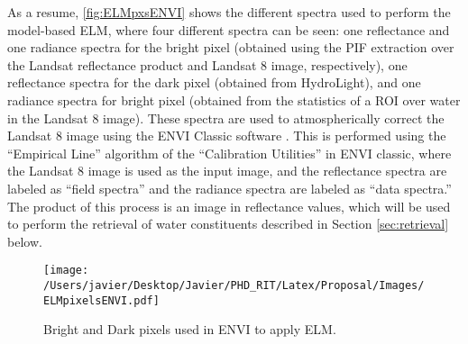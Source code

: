As a resume, \autoref{fig:ELMpxsENVI} shows the different spectra used to perform the model-based ELM, where four different spectra can be seen: one reflectance and one radiance spectra for the bright pixel (obtained using the PIF extraction over the Landsat reflectance product and Landsat 8 image, respectively), one reflectance spectra for the dark pixel (obtained from HydroLight), and one radiance spectra for bright pixel (obtained from the statistics of a ROI over water in the Landsat 8 image). These spectra are used to atmospherically correct the Landsat 8 image using the ENVI Classic software \cite{ENVIUserGuide}. This is performed using the ``Empirical Line'' algorithm of the ``Calibration Utilities'' in ENVI classic, where the Landsat 8 image is used as the input image, and the reflectance spectra are labeled as ``field spectra'' and the radiance spectra are labeled as ``data spectra.'' The product of this process is an image in reflectance values, which will be used to perform the retrieval of water constituents described in Section \ref{sec:retrieval} below. 

\begin{figure}[!ht]
  \centering
  \texttt{[image: /Users/javier/Desktop/Javier/PHD\_RIT/Latex/Proposal/Images/ELMpixelsENVI.pdf]}
  \caption{Bright and Dark pixels used in ENVI to apply ELM. \label{fig:ELMpxsENVI} } 
  \vspace{0.5cm}
\end{figure}


